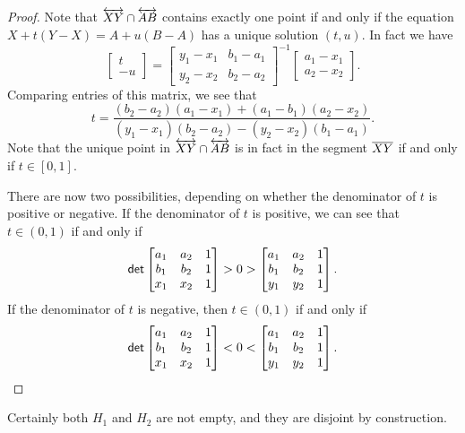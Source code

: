 \begin{proof}
Note that \(\overleftrightarrow{XY} \cap \overleftrightarrow{AB}\) contains exactly one point if and only if the equation \(X + t(Y-X) = A + u(B-A)\) has a unique solution \((t,u)\).
In fact we have \[ \begin{bmatrix} t \\ -u \end{bmatrix} = \begin{bmatrix} y_1 - x_1 & b_1 - a_1 \\ y_2 - x_2 & b_2 - a_2 \end{bmatrix}^{-1} \begin{bmatrix} a_1 - x_1 \\ a_2 - x_2 \end{bmatrix}. \]
Comparing entries of this matrix, we see that \[ t = \frac{(b_2-a_2)(a_1-x_1) + (a_1-b_1)(a_2-x_2)}{(y_1-x_1)(b_2-a_2) - (y_2-x_2)(b_1-a_1)}. \]
Note that the unique point in \(\overleftrightarrow{XY} \cap \overleftrightarrow{AB}\) is in fact in the segment \(\overline{XY}\) if and only if \(t \in [0,1]\).

There are now two possibilities, depending on whether the denominator of \(t\) is positive or negative.
If the denominator of \(t\) is positive, we can see that \(t \in (0,1)\) if and only if \[ \mathsf{det} \begin{bmatrix} a_1 & a_2 & 1 \\ b_1 & b_2 & 1 \\ x_1 & x_2 & 1 \end{bmatrix} > 0 > \begin{bmatrix} a_1 & a_2 & 1 \\ b_1 & b_2 & 1 \\ y_1 & y_2 & 1 \end{bmatrix}. \]
If the denominator of \(t\) is negative, then \(t \in (0,1)\) if and only if \[ \mathsf{det} \begin{bmatrix} a_1 & a_2 & 1 \\ b_1 & b_2 & 1 \\ x_1 & x_2 & 1 \end{bmatrix} < 0 < \begin{bmatrix} a_1 & a_2 & 1 \\ b_1 & b_2 & 1 \\ y_1 & y_2 & 1 \end{bmatrix}. \]
\end{proof}

Certainly both \(H_1\) and \(H_2\) are not empty, and they are disjoint by construction.

